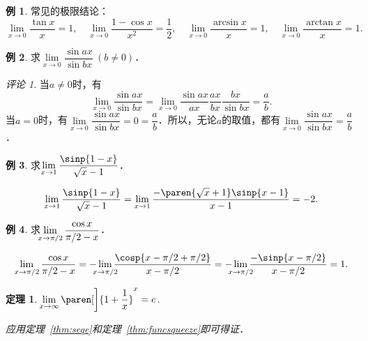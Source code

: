 \documentclass[a4paper,punct=CCT]{ctexbook}
\makeatletter
\newtheorem*{theorem*}{定理}
\theoremstyle{definition}
\newtheorem*{example*}{例}
\theoremstyle{remark}
\newtheorem*{remark}{评论}
\renewcommand*{\proofname}{证}
\renewenvironment{proof}[1][\proofname]{\par
  \pushQED{\qed}%
  \normalfont \topsep6\p@\@plus6\p@\relax
  \trivlist
  \item[\hskip\labelsep
    \bfseries
    #1%
    ]\ignorespaces
}{%
  \popQED\endtrivlist\@endpefalse
}
\makeatother
\begin{document}
\begin{example*}
  常见的极限结论：
  \begin{equation*}
    \lim_{x\to0} \frac{\tan x}{x} = 1,
    \quad
    \lim_{x\to0} \frac{1 - \cos x}{x^2} = \frac12,
    \quad
    \lim_{x\to0} \frac{\arcsin x}{x} = 1,
    \quad
    \lim_{x\to0} \frac{\arctan x}{x} = 1.
  \end{equation*}
\end{example*}

\begin{example*}
  求\(\lim\limits_{x\to0} \dfrac{\sin ax}{\sin bx}\ (b \ne 0)\)．

  \begin{remark}
    当\(a \ne 0\)时，有
    \begin{equation*}
      \lim_{x\to0} \frac{\sin ax}{\sin bx}
      = \lim_{x\to0} \frac{\sin ax}{ax} \frac{ax}{bx} \frac{bx}{\sin bx}
      = \frac ab.
    \end{equation*}
    当\(a = 0\)时，有\(\lim\limits_{x\to0} \dfrac{\sin ax}{\sin bx} = 0 = \dfrac ab\)．所以，无论\(a\)的取值，都有\(\lim\limits_{x\to0} \dfrac{\sin ax}{\sin bx} = \dfrac ab\)．
  \end{remark}
\end{example*}

\begin{example*}
  求\(\lim\limits_{x\to1} \dfrac{\sinp{1-x}}{\sqrt x - 1}\)．\rule{0ex}{3.5ex}

  \begin{equation*}
    \lim_{x\to1} \frac{\sinp{1-x}}{\sqrt x - 1}
    = \lim_{x\to1} \frac{-\paren{\sqrt x + 1} \sinp{x-1}}{x - 1}
    = -2.
  \end{equation*}
\end{example*}

\begin{example*}
  求\(\;\smashoperator[l]{\lim\limits_{x\to\pi/2}} \dfrac{\cos x}{\pi/2 - x}\)．\rule{0ex}{3.5ex}

  \begin{equation*}
    \lim_{x\to\pi/2} \frac{\cos x}{\pi/2 - x}
    = - \smashoperator{\lim_{x\to\pi/2}} \frac{\cosp{x-\pi/2+\pi/2}}{x - \pi/2}
    = - \smashoperator{\lim_{x\to\pi/2}} \frac{-\sinp{x-\pi/2}}{x-\pi/2}
    = 1.
  \end{equation*}
\end{example*}

\begin{theorem*}
  \(\!\lim\limits_{x\to\infty} \paren[\bigg]{1 + \dfrac1x}^x = e\).\rule{0ex}{3.5ex}

  \begin{proof}
    应用定理~\ref{thm:seqe}和定理~\ref{thm:funcsqueeze}即可得证．
  \end{proof}
\end{theorem*}
\end{document}
